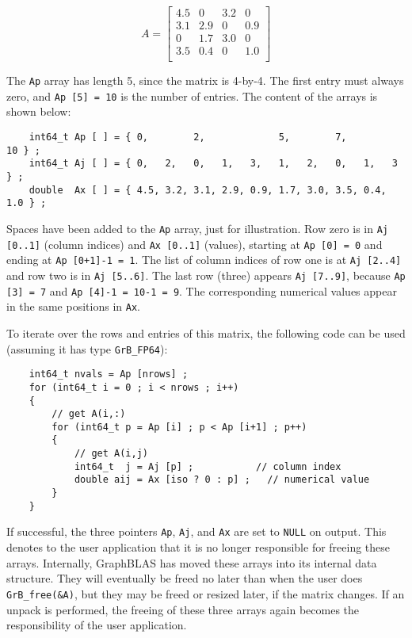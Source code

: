 \documentclass[12pt]{article}
\begin{document}
    \begin{equation}
    \label{eqn:Aexample}
    A = \left[
    \begin{array}{cccc}
    4.5 &   0 & 3.2 &   0 \\
    3.1 & 2.9 &  0  & 0.9 \\
     0  & 1.7 & 3.0 &   0 \\
    3.5 & 0.4 &  0  & 1.0 \\
    \end{array}
    \right]
    \end{equation}

The \verb'Ap' array has length 5, since the matrix is 4-by-4.  The first entry
must always zero, and \verb'Ap [5] = 10' is the number of entries.
The content of the arrays is shown below:

{\footnotesize
\begin{verbatim}
    int64_t Ap [ ] = { 0,        2,             5,        7,            10 } ;
    int64_t Aj [ ] = { 0,   2,   0,   1,   3,   1,   2,   0,   1,   3   } ;
    double  Ax [ ] = { 4.5, 3.2, 3.1, 2.9, 0.9, 1.7, 3.0, 3.5, 0.4, 1.0 } ; \end{verbatim} }

Spaces have been added to the \verb'Ap' array, just for illustration.  Row zero
is in \verb'Aj [0..1]' (column indices) and \verb'Ax [0..1]' (values), starting
at \verb'Ap [0] = 0' and ending at \verb'Ap [0+1]-1 = 1'.  The list of column
indices of row one is at \verb'Aj [2..4]' and row two is in \verb'Aj [5..6]'.
The last row (three) appears \verb'Aj [7..9]', because \verb'Ap [3] = 7' and
\verb'Ap [4]-1 = 10-1 = 9'.  The corresponding numerical values appear in the
same positions in \verb'Ax'.

To iterate over the rows and entries of this matrix, the following code can be
used
(assuming it has type \verb'GrB_FP64'):

    {\footnotesize
    \begin{verbatim}
    int64_t nvals = Ap [nrows] ;
    for (int64_t i = 0 ; i < nrows ; i++)
    {
        // get A(i,:)
        for (int64_t p = Ap [i] ; p < Ap [i+1] ; p++)
        {
            // get A(i,j)
            int64_t  j = Aj [p] ;           // column index
            double aij = Ax [iso ? 0 : p] ;   // numerical value
        }
    } \end{verbatim}}

If successful, the three pointers \verb'Ap', \verb'Aj',
and \verb'Ax' are set to \verb'NULL' on output.  This denotes to the user
application that it is no longer responsible for freeing these arrays.
Internally, GraphBLAS has moved these arrays into its internal data structure.
They will eventually be freed no later than when the user does
\verb'GrB_free(&A)', but they may be freed or resized later, if the matrix
changes.  If an unpack is performed, the freeing of these three arrays again
becomes the responsibility of the user application.
\end{document}

